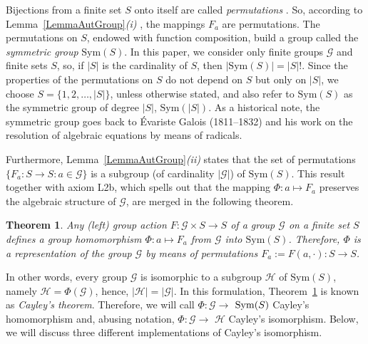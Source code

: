 \documentclass{article}
\newtheorem{theorem}{Theorem}
\begin{document}
Bijections from a finite set $S$ onto itself are called \textit{permutations}%
. So, according to Lemma~\ref{LemmaAutGroup}\emph{(i)}
, the mappings $F_{a}$ are
permutations. The permutations on $S$, endowed with function composition,
build a group called the \textit{symmetric group} $\mathrm{Sym}(S)$. In this
paper, we consider only finite groups $\mathcal{G}$ and finite sets $S$, so,
if $\left\vert S\right\vert $ is the cardinality of $S$, then $\left\vert 
\mathrm{Sym}(S)\right\vert =\left\vert S\right\vert !$. Since the properties
of the permutations on $S$ do not depend on $S$ but only on $\left\vert
S\right\vert $, we choose $S=\{1,2,\ldots,\left\vert S\right\vert \}$, unless
otherwise stated, and also refer to $\mathrm{Sym}(S)$ as the symmetric group
of degree $\left\vert S\right\vert $, $\mathrm{Sym}(\left\vert S\right\vert
) $. As a historical note, the symmetric group goes back to \'{E}variste
Galois (1811--1832) and his work on the resolution of algebraic equations by
means of radicals.

Furthermore, Lemma~\ref{LemmaAutGroup}\emph{(ii)} states that the set of
permutations $\{F_{a}:S\rightarrow S:a\in \mathcal{G}\}$ is a subgroup (of
cardinality $\left\vert \mathcal{G}\right\vert $) of $\mathrm{Sym}(S)$. This
result together with axiom L2b, which spells out that the mapping $\Phi
:a\mapsto F_{a}$ preserves the algebraic structure of $\mathcal{G}$, are
merged in the following theorem.

\begin{theorem}
\label{ThmCayley}Any (left) group action $F:\mathcal{G}\times S\rightarrow S$
of a group $\mathcal{G}$ on a finite set $S$ defines a group homomorphism $%
\Phi :a\mapsto F_{a}$ from $\mathcal{G}$ into $\mathrm{Sym}(S)$. Therefore, $%
\Phi $ is a representation of the group $\mathcal{G}$ by means of
permutations $F_{a}:=F(a,\cdot ):S\rightarrow S$.
\end{theorem}

In other words, every group $\mathcal{G}$ is isomorphic to a subgroup $%
\mathcal{H}$ of $\mathrm{Sym}(S)$, namely $\mathcal{H}=\Phi (\mathcal{G})$,
hence, $\left\vert \mathcal{H}\right\vert =\left\vert \mathcal{G}\right\vert 
$. In this formulation, Theorem~\ref{ThmCayley} is known as \textit{Cayley's
theorem}. Therefore, we will call $\Phi :\mathcal{G}\rightarrow $ $\mathrm{%
Sym}(S)$ Cayley's homomorphism and, abusing notation, $\Phi :\mathcal{G}%
\rightarrow $ $\mathcal{H}$ Cayley's isomorphism. Below, we will discuss
three different implementations of Cayley's isomorphism.
\end{document}
